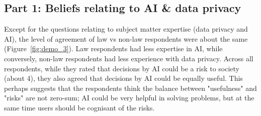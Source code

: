 
\subsection{Part 1: Beliefs relating to AI \& data privacy}
Except for the questions relating to subject matter expertise (data privacy and AI), the level of agreement of law vs non-law respondents were about the same (Figure~\ref{fig:demo_3}). Law respondents had less expertise in AI, while conversely, non-law respondents had less experience with data privacy. Across all respondents, while they rated that decisions by AI could be a risk to society (about 4), they also agreed that decisions by AI could be equally useful. This perhaps suggests that the respondents think the balance between "usefulness" and "risks" are not zero-sum; AI could be very helpful in solving problems, but at the same time users should be cognisant of the risks.

